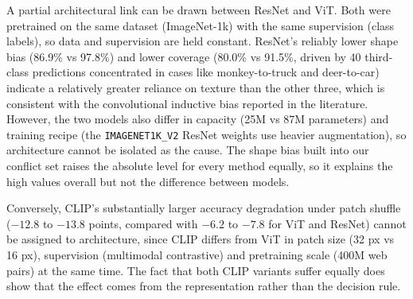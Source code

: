 A partial architectural link can be drawn between ResNet and ViT. Both were pretrained on the same dataset (ImageNet-1k) with the same supervision (class labels), so data and supervision are held constant. ResNet's reliably lower shape bias (86.9\% vs 97.8\%) and lower coverage (80.0\% vs 91.5\%, driven by 40 third-class predictions concentrated in cases like monkey-to-truck and deer-to-car) indicate a relatively greater reliance on texture than the other three, which is consistent with the convolutional inductive bias reported in the literature. However, the two models also differ in capacity (25M vs 87M parameters) and training recipe (the \texttt{IMAGENET1K\_V2} ResNet weights use heavier augmentation), so architecture cannot be isolated as the cause. The shape bias built into our conflict set raises the absolute level for every method equally, so it explains the high values overall but not the difference between models.

Conversely, CLIP's substantially larger accuracy degradation under patch shuffle ($-12.8$ to $-13.8$ points, compared with $-6.2$ to $-7.8$ for ViT and ResNet) cannot be assigned to architecture, since CLIP differs from ViT in patch size (32 px vs 16 px), supervision (multimodal contrastive) and pretraining scale (400M web pairs) at the same time. The fact that both CLIP variants suffer equally does show that the effect comes from the representation rather than the decision rule.

